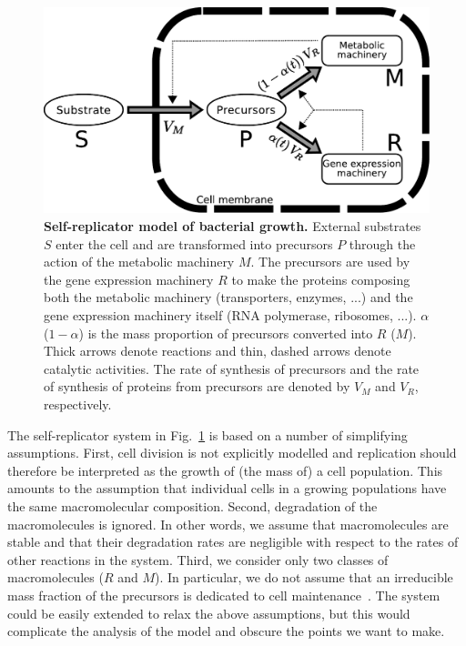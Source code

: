 \begin{figure}[tb]
\centering
\includegraphics[scale=0.7]{./Fig/Fig1}
\caption{
\textbf{Self-replicator model of bacterial growth.}
External substrates $S$ enter the cell and are transformed into precursors $P$ through the action of the metabolic machinery $M$.
The precursors are used by the gene expression machinery $R$ to make the proteins composing both the metabolic machinery (transporters, enzymes, ...) and the gene expression machinery itself (RNA polymerase, ribosomes, ...).
$\alpha$ ($1-\alpha$) is the mass proportion of precursors converted into $R$ ($M$).
Thick arrows denote reactions and thin, dashed arrows denote catalytic activities.
The rate of synthesis of precursors and the rate of synthesis of proteins from precursors are denoted by $V_M$ and $V_R$, respectively.
}
\label{fig:self_replicator}
\end{figure}

The self-replicator system in Fig.~\ref{fig:self_replicator} is based on a number of simplifying assumptions.
First, cell division is not explicitly modelled and replication should therefore be interpreted as the growth of (the mass of) a cell population.
This amounts to the assumption that individual cells in a growing populations have the same macromolecular composition.
Second, degradation of the macromolecules is ignored.
In other words, we assume that macromolecules are stable and that their degradation rates are negligible with respect to the rates of other reactions in the system.
Third, we consider only two classes of macromolecules ($R$ and $M$).
In particular, we do not assume that an irreducible mass fraction of the precursors is dedicated to cell maintenance~\cite{scott_interdependence_2010}.
The system could be easily extended to relax the above assumptions, but this would complicate the analysis of the model and obscure the points we want to make.

